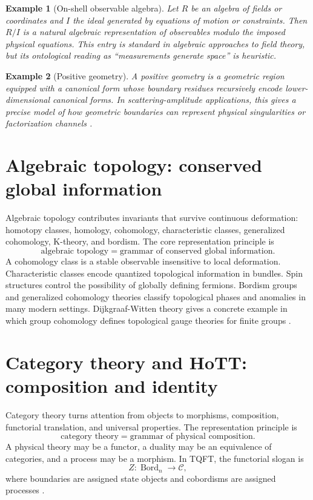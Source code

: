 \documentclass[11pt]{article}
\newtheorem{example}{Example}[section]
\newcommand{\Bord}{\operatorname{Bord}}
\begin{document}
\begin{example}[On-shell observable algebra]
Let $R$ be an algebra of fields or coordinates and $I$ the ideal generated by equations of motion or constraints. Then $R/I$ is a natural algebraic representation of observables modulo the imposed physical equations. This entry is standard in algebraic approaches to field theory, but its ontological reading as ``measurements generate space'' is heuristic.
\end{example}

\begin{example}[Positive geometry]
A positive geometry is a geometric region equipped with a canonical form whose boundary residues recursively encode lower-dimensional canonical forms. In scattering-amplitude applications, this gives a precise model of how geometric boundaries can represent physical singularities or factorization channels \cite{ArkaniHamedBaiLam2017}.
\end{example}

\section{Algebraic topology: conserved global information}

Algebraic topology contributes invariants that survive continuous deformation: homotopy classes, homology, cohomology, characteristic classes, generalized cohomology, K-theory, and bordism. The core representation principle is
\[
\boxed{\text{algebraic topology}=\text{grammar of conserved global information}.}
\]
A cohomology class is a stable observable insensitive to local deformation. Characteristic classes encode quantized topological information in bundles. Spin structures control the possibility of globally defining fermions. Bordism groups and generalized cohomology theories classify topological phases and anomalies in many modern settings. Dijkgraaf-Witten theory gives a concrete example in which group cohomology defines topological gauge theories for finite groups \cite{DijkgraafWitten1990}.

\section{Category theory and HoTT: composition and identity}

Category theory turns attention from objects to morphisms, composition, functorial translation, and universal properties. The representation principle is
\[
\boxed{\text{category theory}=\text{grammar of physical composition}.}
\]
A physical theory may be a functor, a duality may be an equivalence of categories, and a process may be a morphism. In TQFT, the functorial slogan is
\[
Z:\Bord_n\longrightarrow \mathcal C,
\]
where boundaries are assigned state objects and cobordisms are assigned processes \cite{Atiyah1988,Lurie2009}.
\end{document}
